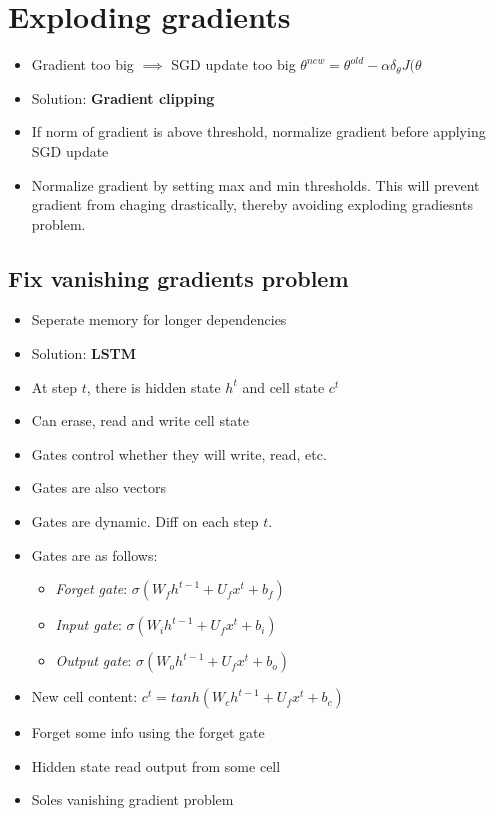 \documentclass[a4paper]{article}
\begin{document}
\section{Exploding gradients}
\begin{itemize}
    \item Gradient too big $\implies$ SGD update too big
        $ \theta^{new} = \theta^{old} - \alpha \delta_{\theta}J(\theta $
    \item Solution: \textbf{Gradient clipping} 
    \item If norm of gradient is above threshold, normalize gradient before applying SGD update
    \item Normalize gradient by setting max and min thresholds. This will prevent gradient from chaging drastically, thereby avoiding exploding gradiesnts problem.
\end{itemize}
\subsection{Fix vanishing gradients problem}
\begin{itemize}
    \item Seperate memory for longer dependencies
    \item Solution: \textbf{LSTM}  
    \item At step $t$, there is hidden state $h^t$ and cell state $c^t$
     \item Can erase, read and write cell state
    \item Gates control whether they will write, read, etc.
    \item Gates are also vectors
    \item Gates are dynamic. Diff on each step $t$.
    \item Gates are as follows:
    \begin{itemize}
        \item \textit{Forget gate}: $\sigma(W_fh^{t-1} + U_fx^t + b_f)$
        \item \textit{Input gate}: $\sigma(W_ih^{t-1} + U_fx^t + b_i)$
        \item \textit{Output gate}: $\sigma(W_oh^{t-1} + U_fx^t + b_o)$
    \end{itemize}
    \item New cell content: $c^t = tanh(W_ch^{t-1} + U_fx^t + b_c)$
    \item Forget some info using the forget gate
    \item Hidden state read output from some cell
    \item Soles vanishing gradient problem
\end{itemize}
\end{document}
